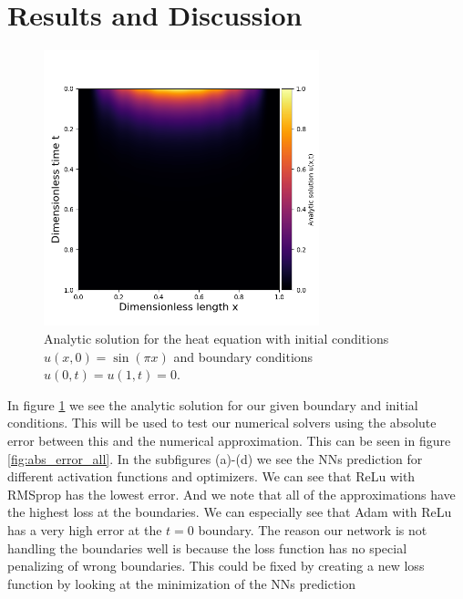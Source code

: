 \section{Results and Discussion}

\begin{figure}[h!]
    \centering
    \includegraphics[width=8cm]{../Figures/analytic_solution.png}
    \caption{Analytic solution for the heat equation with initial conditions
    $u(x,0)=\sin{(\pi x)}$ and boundary conditions $u(0,t)=u(1,t)=0$.}
    \label{fig:analytic_solution}
\end{figure}

In figure \ref{fig:analytic_solution} we see the analytic solution for our
given boundary and initial conditions. This will be used to test our numerical
solvers using the absolute error between this and the numerical approximation.
This can be seen in figure \ref{fig:abs_error_all}. In the subfigures (a)-(d)
we see the NNs prediction for different activation functions and optimizers. We
can see that ReLu with RMSprop has the lowest error. And we note that all of
the approximations have the highest loss at the boundaries. We can especially
see that Adam with ReLu has a very high error at the $t=0$ boundary. The reason
our network is not handling the boundaries well is because the loss function
has no special penalizing of wrong boundaries. This could be fixed by creating
a new loss function by looking at the minimization of the NNs prediction


